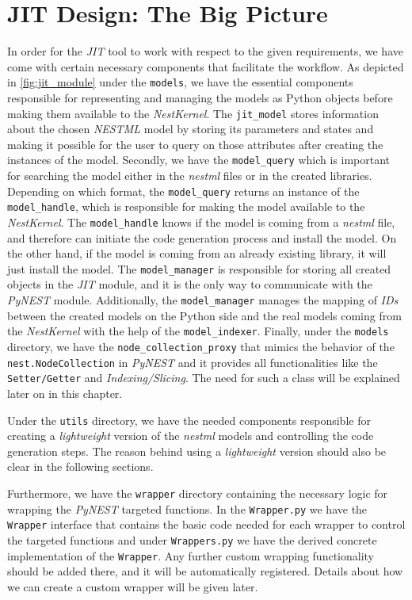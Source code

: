 

\section{JIT Design: The Big Picture}

In order for the \emph{JIT} tool to work with respect to the given requirements, we have come with certain necessary components that facilitate the workflow. As depicted in \autoref{fig:jit_module} under the \texttt{models}, we have the essential components responsible for representing and managing the models as Python objects before making them available to the \emph{NestKernel}. The \texttt{jit\_model} stores information about the chosen \emph{NESTML} model by storing its parameters and states and making it possible for the user to query on those attributes after creating the instances of the model. Secondly, we have the \texttt{model\_query} which is important for searching the model either in the \emph{nestml} files or in the created libraries. Depending on which format, the \texttt{model\_query} returns an instance of the \texttt{model\_handle}, which is responsible for making the model available to the \emph{NestKernel}. The  \texttt{model\_handle} knows if the model is coming from a \emph{nestml} file, and therefore can initiate the code generation process and install the model. On the other hand, if the model is coming from an already existing library, it will just install the model. The \texttt{model\_manager} is responsible for storing all created objects in the \emph{JIT} module, and it is the only way to communicate with the \emph{PyNEST} module. Additionally, the \texttt{model\_manager} manages the mapping of \emph{IDs} between the created models on the Python side and the real models coming from the \emph{NestKernel} with the help of the \texttt{model\_indexer}. Finally, under the \texttt{models} directory, we have the \texttt{node\_collection\_proxy} that mimics the behavior of the \texttt{nest.NodeCollection} in \emph{PyNEST} and it provides all functionalities like the \texttt{Setter/Getter} and \emph{Indexing/Slicing}. The need for such a class will be explained later on in this chapter. 


Under the \texttt{utils} directory, we have the needed components responsible for creating a \emph{lightweight} version of the \emph{nestml} models and controlling the code generation steps. The reason behind using a \emph{lightweight} version should also be clear in the following sections.

Furthermore, we have the \texttt{wrapper} directory containing the necessary logic for wrapping the \emph{PyNEST} targeted functions. In the \texttt{Wrapper.py} we have the \texttt{Wrapper} interface that contains the basic code needed for each wrapper to control the targeted functions and under \texttt{Wrappers.py} we have the derived concrete implementation of the \texttt{Wrapper}. Any further custom wrapping functionality should be added there, and it will be automatically registered. Details about how we can create a custom wrapper will be given later.

